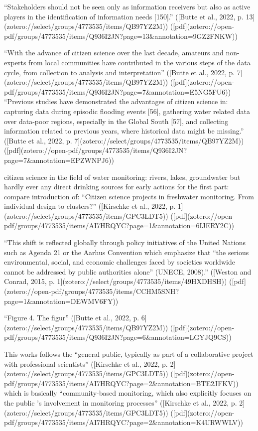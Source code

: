 {“Stakeholders should not be seen only as information receivers but also as active players in the identification of information needs [150].” ([Butte et al., 2022, p. 13](zotero://select/groups/4773535/items/QB97YZ2M)) ([pdf](zotero://open-pdf/groups/4773535/items/Q936I2JN?page=13&annotation=9GZ2FNKW))

“With the advance of citizen science over the last decade, amateurs and non-experts from local communities have contributed in the various steps of the data cycle, from collection to analysis and interpretation” ([Butte et al., 2022, p. 7](zotero://select/groups/4773535/items/QB97YZ2M)) ([pdf](zotero://open-pdf/groups/4773535/items/Q936I2JN?page=7&annotation=E5NG5FU6))
“Previous studies have demonstrated the advantages of citizen science in: capturing data during episodic flooding events [56], gathering water related data over data-poor regions, especially in the Global South [57], and collecting information related to previous years, where historical data might be missing.” ([Butte et al., 2022, p. 7](zotero://select/groups/4773535/items/QB97YZ2M)) ([pdf](zotero://open-pdf/groups/4773535/items/Q936I2JN?page=7&annotation=EPZWNPJ6))

citizen science in the field of water monitoring: rivers, lakes, groundwater but hardly ever any direct drinking sources for early actions
for the first part: compare introduction of: “Citizen science projects in freshwater monitoring. From individual design to clusters?” ([Kirschke et al., 2022, p. 1](zotero://select/groups/4773535/items/GPC3LDT5)) ([pdf](zotero://open-pdf/groups/4773535/items/AI7HRQYC?page=1&annotation=6IJERY2C))


“This shift is reflected globally through policy initiatives of the United Nations such as Agenda 21 or the Aarhus Convention which emphasize that “the serious environmental, social, and economic challenges faced by societies worldwide cannot be addressed by public authorities alone” (UNECE, 2008).” ([Weston and Conrad, 2015, p. 1](zotero://select/groups/4773535/items/49HXDHSH)) ([pdf](zotero://open-pdf/groups/4773535/items/CCHM5SNH?page=1&annotation=DEWMV6FY))

“Figure 4. The figur” ([Butte et al., 2022, p. 6](zotero://select/groups/4773535/items/QB97YZ2M)) ([pdf](zotero://open-pdf/groups/4773535/items/Q936I2JN?page=6&annotation=LGYJQ9CS))

This works follows the “general public, typically as part of a collaborative project with professional scientists” ([Kirschke et al., 2022, p. 2](zotero://select/groups/4773535/items/GPC3LDT5)) ([pdf](zotero://open-pdf/groups/4773535/items/AI7HRQYC?page=2&annotation=BTE2JFKV)) which is basically “community-based monitoring, which also explicitly focuses on the public ’s involvement in monitoring processes” ([Kirschke et al., 2022, p. 2](zotero://select/groups/4773535/items/GPC3LDT5)) ([pdf](zotero://open-pdf/groups/4773535/items/AI7HRQYC?page=2&annotation=K4URWWLV))

}
